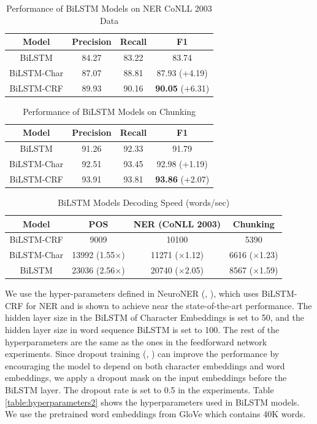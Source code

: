 \begin{table}[]
\centering
\caption{Performance of BiLSTM Models on NER CoNLL 2003 Data}
\label{table:lstm-table2}
\begin{tabular}{|c|c|c|c|}
\hline
Model  & Precision & Recall & F1      \\ \hline
BiLSTM  & 84.27 & 83.22 & 83.74     \\ \hline
BiLSTM-Char & 87.07 & 88.81 & 87.93 (+4.19)\\ \hline
BiLSTM-CRF & 89.93 & 90.16 & \textbf{90.05} (+6.31)  \\ \hline
\end{tabular}
\end{table}

\begin{table}[]
\centering
\caption{Performance of BiLSTM Models on Chunking}
\label{table:lstm-table3}
\begin{tabular}{|c|c|c|c|}
\hline
Model  & Precision & Recall & F1      \\ \hline
BiLSTM  & 91.26 & 92.33 & 91.79    \\ \hline
BiLSTM-Char & 92.51 & 93.45 & 92.98 (+1.19)\\ \hline
BiLSTM-CRF & 93.91 & 93.81 & \textbf{93.86} (+2.07)  \\ \hline
\end{tabular}
\end{table}

\begin{table}[]
\centering
\caption{BiLSTM Models Decoding Speed (words/sec)}
\label{table:lstm-table4}
\begin{tabular}{|c|c|c|c|}
\hline
Model       & POS & NER (CoNLL 2003) & Chunking    \\ \hline
BiLSTM-CRF    & 9009     & 10100   &5390\\ \hline
BiLSTM-Char        & 13992 (1.55$\times$)    & 11271 ($\times$1.12) &6616 ($\times$1.23) \\ \hline
BiLSTM             & 23036 (2.56$\times$)   & 20740 ($\times$2.05)  &8567 ($\times$1.59)\\ \hline
\end{tabular}
\end{table}

We use the hyper-parameters defined in NeuroNER  (\citeauthor{2017neuroner}, \citeyear{2017neuroner}), which uses BiLSTM-CRF for NER and is shown to achieve near the state-of-the-art performance. The hidden layer size in the BiLSTM of Character Embeddings is set to 50, and the hidden layer size in word sequence BiLSTM is set to 100. The rest of the hyperparameters are the same as the ones in the feedforward network experiments. Since dropout training (\citeauthor{hinton2012improving}, \citeyear{hinton2012improving}) can improve the performance by encouraging the model to depend on both character embeddings and word embeddings, we apply a dropout mask on the input embeddings before the BiLSTM layer. The dropout rate is set to 0.5 in the experiments. Table \ref{table:hyperparameters2} shows the hyperparameters used in BiLSTM models. We use the pretrained word embeddings from GloVe which contains 40K words.


